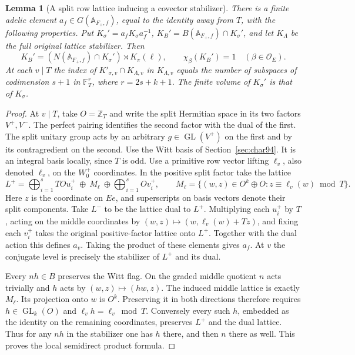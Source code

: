 \documentclass[a4paper,11pt]{article}
\newtheorem{lemma}[proposition]{Lemma}
\theoremstyle{definition}
\theoremstyle{remark}
\newcommand{\ZZ}{\mathbb Z}\newcommand{\ord}{\operatorname{ord}}
\numberwithin{equation}{section}
\newcommand{\GL}{\operatorname{GL}}
\newcommand{\OO}{\mathcal O}
\begin{document}
\begin{lemma}[A split row lattice inducing a covector stabilizer]
\leavevmode\label{lem:level112}
There is a finite adelic element \(a_f\in G(\mathbb A_{F_+,f})\),
equal to the identity away from \(T\), with the following properties.
Put \(K_\sigma'=a_fK_\sigma a_f^{-1}\), \(K_B'=B(\mathbb A_{F_+,f})
\cap K_\sigma'\), and let \(K_\Lambda\) be the full original
lattice stabilizer. Then
\[
 K_B'=(N(\mathbb A_{F_+,f})\cap K_\sigma')\rtimes K_\pi(\ell),
 \qquad \chi_\beta(K_B')=1\quad(\beta\in\OO_E).
\]
At each \(v\mid T\) the index of \(K'_{\sigma,v}\cap K_{\Lambda,v}\)
in \(K_{\Lambda,v}\) equals the number of subspaces of codimension
\(s+1\) in \(\mathbb F_T^r\), where \(r=2s+k+1\). The finite
volume of \(K_\sigma'\) is that of \(K_\sigma\).
\end{lemma}
\begin{proof}
At \(v\mid T\), take \(O=\ZZ_T\) and write the split Hermitian
space in its two factors \(V^+,V^-\). The perfect pairing
identifies the second factor with the dual of the first. The
split unitary group acts by an arbitrary \(g\in\GL(V^+)\) on
the first and by its contragredient on the second. Use the Witt
basis of Section~\ref{sec:char94}. It is an integral basis
locally, since \(T\) is odd. Use a primitive row vector lifting
\(\ell_v\), also denoted \(\ell_v\), on the \(W_0^+\) coordinates.
In the positive split factor take the lattice
\[
 L^+=\bigoplus_{i=1}^s TOu_i^+
       \ \oplus\ M_\ell\
       \oplus\bigoplus_{i=1}^s Ov_i^+,\qquad
 M_\ell=\{(w,z)\in O^k\oplus O:z\equiv\ell_v(w)\bmod T\}.
\]
Here \(z\) is the coordinate on \(Ee\), and superscripts on
basis vectors denote their split components. Take \(L^-\) to
be the lattice dual to \(L^+\). Multiplying each \(u_i^+\)
by \(T\), acting on the middle coordinates by
\((w,z)\mapsto(w,\ell_v(w)+Tz)\), and fixing each \(v_i^+\)
takes the original positive-factor lattice onto \(L^+\).
Together with the dual action this defines \(a_v\). Taking the
product of these elements gives \(a_f\). At \(v\) the conjugate
level is precisely the stabilizer of \(L^+\) and its dual.

Every \(nh\in B\) preserves the Witt flag. On the graded middle
quotient \(n\) acts trivially and \(h\) acts by \((w,z)\mapsto
(hw,z)\). The induced middle lattice is exactly \(M_\ell\).
Its projection onto \(w\) is \(O^k\). Preserving it in both
directions therefore requires \(h\in\GL_k(O)\) and
\(\ell_vh=\ell_v\bmod T\). Conversely every such \(h\), embedded
as the identity on the remaining coordinates, preserves \(L^+\)
and the dual lattice. Thus for any \(nh\) in the stabilizer
one has \(h\) there, and then \(n\) there as well. This proves
the local semidirect product formula.


\end{proof}
\end{document}
